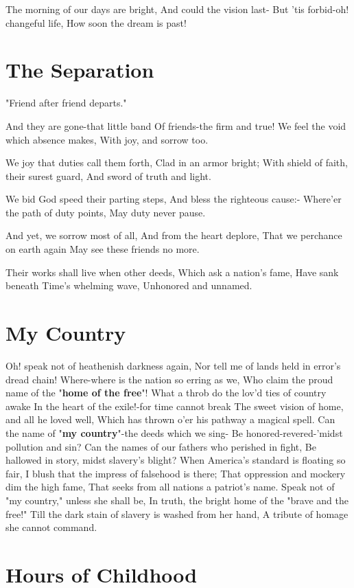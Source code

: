 \documentclass[11pt,a4paper]{article}
\begin{document}
The morning of our days are bright,
And could the vision last-
But 'tis forbid-oh! changeful life,
How soon the dream is past!

\section{The Separation}

"Friend after friend departs."

And they are gone-that little band
Of friends-the firm and true!
We feel the void which absence makes,
With joy, and sorrow too.

We joy that duties call them forth,
Clad in an armor bright;
With shield of faith, their surest guard,
And sword of truth and light.

We bid God speed their parting steps,
And bless the righteous cause:-
Where'er the path of duty points,
May duty never pause.

And yet, we sorrow most of all,
And from the heart deplore,
That we perchance on earth again
May see these friends no more.

Their works shall live when other deeds,
Which ask a nation's fame,
Have sank beneath Time's whelming wave,
Unhonored and unnamed.

\section{My Country}

Oh! speak not of heathenish darkness again,
Nor tell me of lands held in error's dread chain!
Where-where is the nation so erring as we,
Who claim the proud name of the "\textbf{home of the free}"!
What a throb do the lov'd ties of country awake
In the heart of the exile!-for time cannot break
The sweet vision of home, and all he loved well,
Which has thrown o'er his pathway a magical spell.
Can the name of "\textbf{my country}"-the deeds which we sing-
Be honored-revered-'midst pollution and sin?
Can the names of our fathers who perished in fight,
Be hallowed in story, midst slavery's blight?
When America's standard is floating so fair,
I blush that the impress of falsehood is there;
That oppression and mockery dim the high fame,
That seeks from all nations a patriot's name.
Speak not of "my country," unless she shall be,
In truth, the bright home of the "brave and the free!"
Till the dark stain of slavery is washed from her hand,
A tribute of homage she cannot command.

\section{Hours of Childhood}
\end{document}
